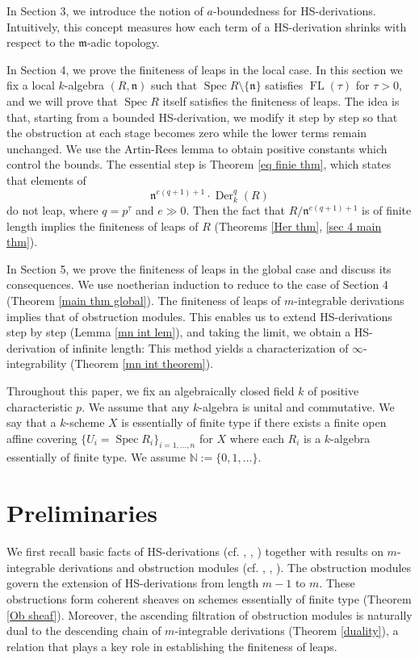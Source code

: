 \documentclass{amsart}
\newcommand{\FL}[1]{\operatorname{FL}(#1)}
\begin{document}
In Section 3, we introduce the notion of $a$-boundedness for HS-derivations. Intuitively, this concept measures how each term of a HS-derivation shrinks with respect to the $\mathfrak{m}$-adic topology.

In Section 4, we prove the finiteness of leaps in the local case. In this section we fix a local $k$-algebra $(R,\mathfrak{n})$ such that $\operatorname{Spec}R\setminus \{\mathfrak{n}\}$ satisfies $\FL{\tau}$ for $\tau>0$, and we will prove that $\operatorname{Spec}R$ itself satisfies the finiteness of leaps. The idea is that, starting from a bounded HS-derivation, we modify it step by step so that the obstruction at each stage becomes zero while the lower terms remain unchanged. We use the Artin-Rees lemma to obtain positive constants which control the bounds. The essential step is Theorem \ref{eq finie thm}, which states that elements of $$\mathfrak{n}^{e(q+1)+1} \cdot \operatorname{Der}_k^{q}(R)$$ do not leap, where $q=p^\tau$ and $e\gg 0$. Then the fact that $R/\mathfrak{n}^{e(q+1)+1} $ is of finite length implies the finiteness of leaps of $R$ (Theorems \ref{Her thm}, \ref{sec 4 main thm}).

In Section 5, we prove the finiteness of leaps in the global case and discuss its consequences. We use noetherian induction to reduce to the case of Section 4 (Theorem \ref{main thm global}). The finiteness of leaps of $m$-integrable derivations implies that of obstruction modules. This enables us to extend HS-derivations step by step (Lemma \ref{mn int lem}), and taking the limit, we obtain a HS-derivation of infinite length: This method yields a characterization of $\infty$-integrability (Theorem \ref{mn int theorem}).


Throughout this paper, we fix an algebraically closed field $k$ of positive characteristic $p$. We assume that any $k$-algebra is unital and commutative. We say that a $k$-scheme $X$ is essentially of finite type if there exists a finite open affine covering $\{U_i=\operatorname{Spec}R_i\}_{i=1,\dots,n}$ for $X$ where each $R_i$ is a $k$-algebra essentially of finite type. We assume $\mathbb{N}:=\{0,1,\dots\}$.

\section{Preliminaries}

We first recall basic facts of HS-derivations (cf. \cite{SchmidtHasse+1937+215+237}, \cite[Chapter 1]{NARVAEZMACARRO20122712}, \cite[\S 27]{Mat}) together with results on $m$-integrable derivations and obstruction modules (cf. \cite{NARVAEZMACARRO20122712}, \cite{Her}, \cite[\S 2]{miy2025}). The obstruction modules govern the extension of HS-derivations from length $m-1$ to $m$. These obstructions form coherent sheaves on schemes essentially of finite type (Theorem \ref{Ob sheaf}). Moreover, the ascending filtration of obstruction modules is naturally dual to the descending chain of
$m$-integrable derivations (Theorem \ref{duality}), a relation that plays a key role in establishing the finiteness of leaps.
\end{document}
